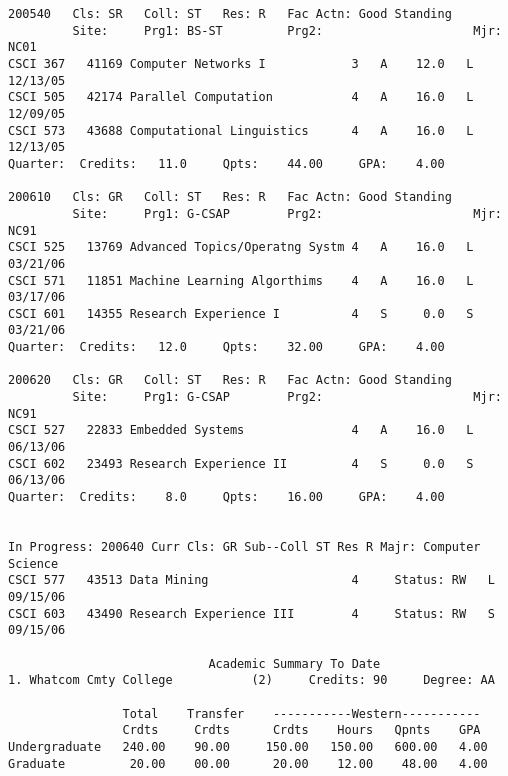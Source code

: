 \documentclass[line]{res}
\begin{document}
\begin{resume}
\begin{verbatim}
200540   Cls: SR   Coll: ST   Res: R   Fac Actn: Good Standing    
         Site:     Prg1: BS-ST         Prg2:                     Mjr: NC01
CSCI 367   41169 Computer Networks I            3   A    12.0   L  12/13/05                          
CSCI 505   42174 Parallel Computation           4   A    16.0   L  12/09/05                          
CSCI 573   43688 Computational Linguistics      4   A    16.0   L  12/13/05                          
Quarter:  Credits:   11.0     Qpts:    44.00     GPA:    4.00
                                                                                
200610   Cls: GR   Coll: ST   Res: R   Fac Actn: Good Standing    
         Site:     Prg1: G-CSAP        Prg2:                     Mjr: NC91
CSCI 525   13769 Advanced Topics/Operatng Systm 4   A    16.0   L  03/21/06                          
CSCI 571   11851 Machine Learning Algorthims    4   A    16.0   L  03/17/06                          
CSCI 601   14355 Research Experience I          4   S     0.0   S  03/21/06                          
Quarter:  Credits:   12.0     Qpts:    32.00     GPA:    4.00
                                                                                
200620   Cls: GR   Coll: ST   Res: R   Fac Actn: Good Standing    
         Site:     Prg1: G-CSAP        Prg2:                     Mjr: NC91
CSCI 527   22833 Embedded Systems               4   A    16.0   L  06/13/06                          
CSCI 602   23493 Research Experience II         4   S     0.0   S  06/13/06                          
Quarter:  Credits:    8.0     Qpts:    16.00     GPA:    4.00
                                                                                
 
In Progress: 200640 Curr Cls: GR Sub--Coll ST Res R Majr: Computer Science 
CSCI 577   43513 Data Mining                    4     Status: RW   L  09/15/06                         
CSCI 603   43490 Research Experience III        4     Status: RW   S  09/15/06                         
                                                                                
                            Academic Summary To Date
1. Whatcom Cmty College           (2)     Credits: 90     Degree: AA
                                                                                
                Total    Transfer    -----------Western-----------
                Crdts     Crdts      Crdts    Hours   Qpnts    GPA
Undergraduate   240.00    90.00     150.00   150.00   600.00   4.00
Graduate         20.00    00.00      20.00    12.00    48.00   4.00
                                                                                

\end{verbatim}
\end{resume}
\end{document}
